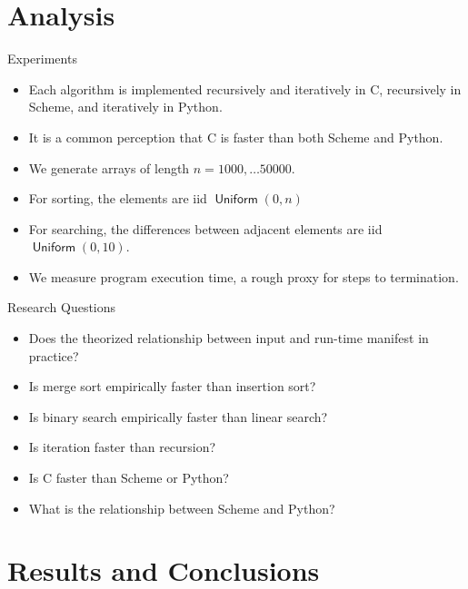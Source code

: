 \documentclass[]{beamer}
\DeclareMathOperator*{\uniform}{\mathsf{Uniform}}
\begin{document}
\section{Analysis}
\begin{frame}[t]{Experiments}
	\begin{itemize}
    \item Each algorithm is implemented recursively and iteratively in C, recursively in Scheme, and iteratively in Python.
    \item It is a common perception that C is faster than both Scheme and Python.
    \item We generate arrays of length $n = 1000, \ldots 50000$.
    \item For sorting, the elements are iid $\uniform(0, n)$
    \item For searching, the differences between adjacent elements are iid $\uniform(0,10)$.
	\item We measure program execution time, a rough proxy for steps to termination.
\end{itemize}
\end{frame}

\begin{frame}[t]{Research Questions}
\begin{itemize}
	\item Does the theorized relationship between input and run-time manifest in practice?
    \item Is merge sort empirically faster than insertion sort?
    \item Is binary search empirically faster than linear search?
    \item Is iteration faster than recursion?
    \item Is C faster than Scheme or Python?
    \item What is the relationship between Scheme and Python?
\end{itemize}

\end{frame}

\section{Results and Conclusions}
\end{document}
